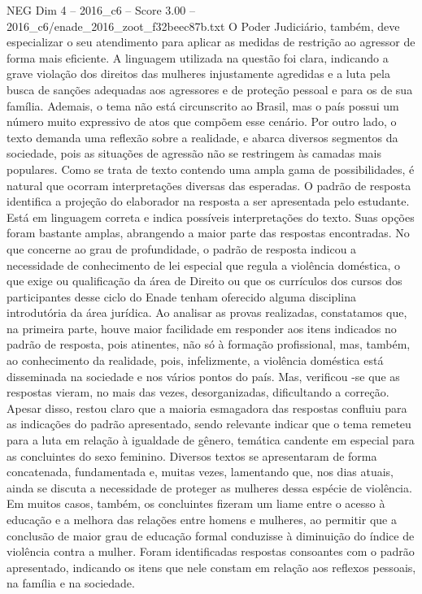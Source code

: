 \begin{textsample}{NEG Dim 4 – 2016\_c6 – Score 3.00 – 2016\_c6/enade\_2016\_zoot\_f32beec87b.txt}
O Poder Judiciário, também, deve especializar o seu atendimento para aplicar as medidas de restrição ao agressor de forma mais eficiente.
A linguagem utilizada na questão foi clara, indicando a grave violação dos direitos das mulheres injustamente agredidas e a luta pela busca de sanções adequadas aos agressores e de proteção pessoal e para os de sua família.
Ademais, o tema não está circunscrito ao Brasil, mas o país possui um número muito expressivo de atos que compõem esse cenário.
Por outro lado, o texto demanda uma reflexão sobre a realidade, e abarca diversos segmentos da sociedade, pois as situações de agressão não se restringem às camadas mais populares.
Como se trata de texto contendo uma ampla gama de possibilidades, é natural que ocorram interpretações diversas das esperadas.
O padrão de resposta identifica a projeção do elaborador na resposta a ser apresentada pelo estudante.
Está em linguagem correta e indica possíveis interpretações do texto.
Suas opções foram bastante amplas, abrangendo a maior parte das respostas encontradas.
No que concerne ao grau de profundidade, o padrão de resposta indicou a necessidade de conhecimento de lei especial que regula a violência doméstica, o que exige ou qualificação da área de Direito ou que os currículos dos cursos dos participantes desse ciclo do Enade tenham oferecido alguma disciplina introdutória da área jurídica.
Ao analisar as provas realizadas, constatamos que, na primeira parte, houve maior facilidade em responder aos itens indicados no padrão de resposta, pois atinentes, não só à formação profissional, mas, também, ao conhecimento da realidade, pois, infelizmente, a violência doméstica está disseminada na sociedade e nos vários pontos do país.
Mas, verificou -se que as respostas vieram, no mais das vezes, desorganizadas, dificultando a correção.
Apesar disso, restou claro que a maioria esmagadora das respostas confluiu para as indicações do padrão apresentado, sendo relevante indicar que o tema remeteu para a luta em relação à igualdade de gênero, temática candente em especial para as concluintes do sexo feminino.
Diversos textos se apresentaram de forma concatenada, fundamentada e, muitas vezes, lamentando que, nos dias atuais, ainda se discuta a necessidade de proteger as mulheres dessa espécie de violência.
Em muitos casos, também, os concluintes fizeram um liame entre o acesso à educação e a melhora das relações entre homens e mulheres, ao permitir que a conclusão de maior grau de educação formal conduzisse à diminuição do índice de violência contra a mulher.
Foram identificadas respostas consoantes com o padrão apresentado, indicando os itens que nele constam em relação aos reflexos pessoais, na família e na sociedade.

\end{textsample}
